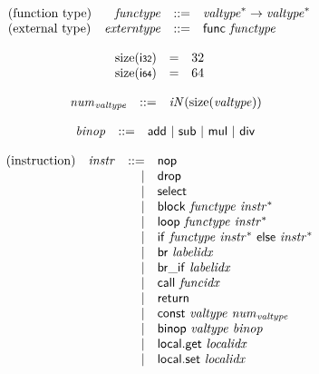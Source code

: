 \documentclass{article}
\begin{document}
$$
\begin{array}{@{}lrrl@{}l@{}}
	\mbox{(function type)} & {\mathit{functype}} &::=& {{\mathit{valtype}}^\ast} \rightarrow {{\mathit{valtype}}^\ast} \\
	\mbox{(external type)} & {\mathit{externtype}} &::=& \mathsf{func}~{\mathit{functype}} \\
\end{array}
$$

\vspace{1ex}

$$
\begin{array}{@{}lcl@{}l@{}}
	{\mathrm{size}}(\mathsf{i{\scriptstyle 32}}) &=& 32 \\
	{\mathrm{size}}(\mathsf{i{\scriptstyle 64}}) &=& 64 \\
\end{array}
$$

$$
\begin{array}{@{}lrrl@{}l@{}}
	& {{\mathit{num}}}_{{\mathit{valtype}}} &::=& {\mathit{iN}}({\mathrm{size}}({\mathit{valtype}})) \\
\end{array}
$$

\vspace{1ex}

$$
\begin{array}{@{}lrrl@{}l@{}}
	& {\mathit{binop}} &::=& \mathsf{add} ~|~ \mathsf{sub} ~|~ \mathsf{mul} ~|~ \mathsf{div} \\
\end{array}
$$

\vspace{1ex}

$$
\begin{array}{@{}lrrl@{}l@{}}
	\mbox{(instruction)} & {\mathit{instr}} &::=& \mathsf{nop} \\ &&|&
	\mathsf{drop} \\ &&|&
	\mathsf{select} \\ &&|&
	\mathsf{block}~{\mathit{functype}}~{{\mathit{instr}}^\ast} \\ &&|&
	\mathsf{loop}~{\mathit{functype}}~{{\mathit{instr}}^\ast} \\ &&|&
	\mathsf{if}~{\mathit{functype}}~{{\mathit{instr}}^\ast}~\mathsf{else}~{{\mathit{instr}}^\ast} \\ &&|&
	\mathsf{br}~{\mathit{labelidx}} \\ &&|&
	\mathsf{br\_if}~{\mathit{labelidx}} \\ &&|&
	\mathsf{call}~{\mathit{funcidx}} \\ &&|&
	\mathsf{return} \\ &&|&
	\mathsf{const}~{\mathit{valtype}}~{{\mathit{num}}}_{{\mathit{valtype}}} \\ &&|&
	\mathsf{binop}~{\mathit{valtype}}~{\mathit{binop}} \\ &&|&
	\mathsf{local.get}~{\mathit{localidx}} \\ &&|&
	\mathsf{local.set}~{\mathit{localidx}} \\
\end{array}
$$
\end{document}
